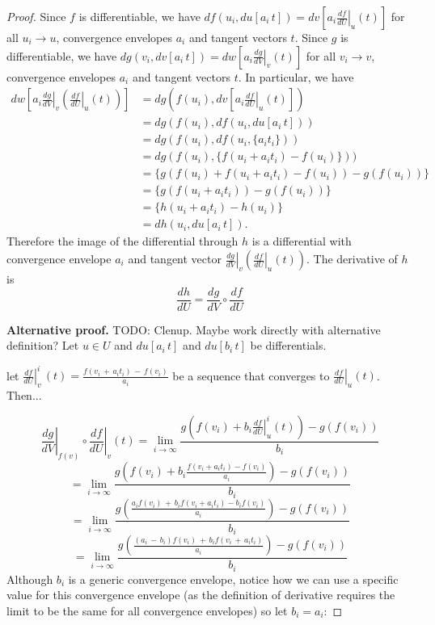 \documentclass[11pt,letterpaper,fleqn]{memoir}
\begin{document}
\begin{proof}
		Since $f$ is differentiable, we have $df(u_i, du[a_i \, t]) = dv[a_i \left.\frac{df}{dU}\right|_{u}(t) ]$ for all $u_i \to u$, convergence envelopes $a_i$ and tangent vectors $t$. Since $g$ is differentiable, we have $dg(v_i, dv[a_i \, t]) = dw[a_i \left.\frac{dg}{dV}\right|_{v}(t) ]$ for all $v_i \to v$, convergence envelopes $a_i$ and tangent vectors $t$. In particular, we have
		\begin{equation}
			\begin{aligned}
				dw[a_i \left.\frac{dg}{dV}\right|_{v}\left(\left.\frac{df}{dU}\right|_{u}(t)\right) ] &= dg(f(u_i), dv[a_i \left.\frac{df}{dU}\right|_{u}(t) ]) \\
				&= dg(f(u_i), df(u_i, du[a_i \, t])) \\
				&= dg(f(u_i), df(u_i, \{a_i t_i\})) \\
				&=dg(f(u_i), \{ f(u_i + a_i t_i) - f(u_i) \})) \\
				&=\{g(f(u_i) + f(u_i + a_i t_i) - f(u_i))- g(f(u_i))\} \\
				&=\{g(f(u_i + a_i t_i))- g(f(u_i))\} \\
				&=\{h(u_i + a_i t_i)- h(u_i)\} \\
				&=dh(u_i, du[a_i \, t]).
			\end{aligned}
		\end{equation}
		Therefore the image of the differential through $h$ is a differential with convergence envelope $a_i$ and tangent vector $\left.\frac{dg}{dV}\right|_{v}\left(\left.\frac{df}{dU}\right|_{u}(t)\right)$. The derivative of $h$ is
		\begin{equation}
			\frac{dh}{dU} = \frac{dg}{dV} \circ \frac{df}{dU}
		\end{equation}

\textbf{Alternative proof.} TODO: Clenup. Maybe work directly with alternative definition? Let $u \in U$ and $du[a_{i}\, t]$ and $du[b_{i}\,t]$ be differentials.

let $\left.\frac{df}{dU}\right|_{v}^{i}\,(t) = \frac{f(v_{i}\,+\,a_{i} t_{i})\,-\,f(v_{i})}{a_{i}}$ be a sequence that converges to $\left.\frac{df}{dU}\right|_{u}(t)$. Then...

$$
\left.\frac{dg}{dV}\right|_{f(v)} \circ \left.\frac{df}{dU}\right|_{v} (t) = \lim_{ i \to \infty } \frac{g\left( f(v_{i}) + b_{i}\left.\frac{df}{dU}\right|_{u}^{i}(t) \right) - g(f(v_{i}))}{b_{i}} 
$$
$$
= \lim_{i \to \infty} \frac{g(f(v_{i}) + b_{i}\frac{f(v_{i} + a_{i}t_{i}) - f(v_{i})}{a_{i}}) - g(f(v_{i}))}{b_{i}} 
$$
$$
= \lim_{i \to \infty} \frac{g(\frac{a_{i}f(v_{i})\,+\,b_{i}f(v_{i}+a_{i}t_{i}) - b_{i}f(v_{i})}{a_{i}}) - g(f(v_{i}))}{b_{i}} 
$$
$$
= \lim_{i \to \infty} \frac{g(\frac{(a_{i}\,-\,b_{i})f(v_{i})\,+\,b_{i}f(v_{i}\,+\,a_{i}t_{i})}{a_{i}}) - g(f(v_{i}))}{b_{i}} 
$$
Although $b_{i}$ is a generic convergence envelope, notice how we can use a specific value for this convergence envelope (as the definition of derivative requires the limit to be the same for all convergence envelopes) so let $b_{i} = a_{i}$:


\end{proof}
\end{document}
